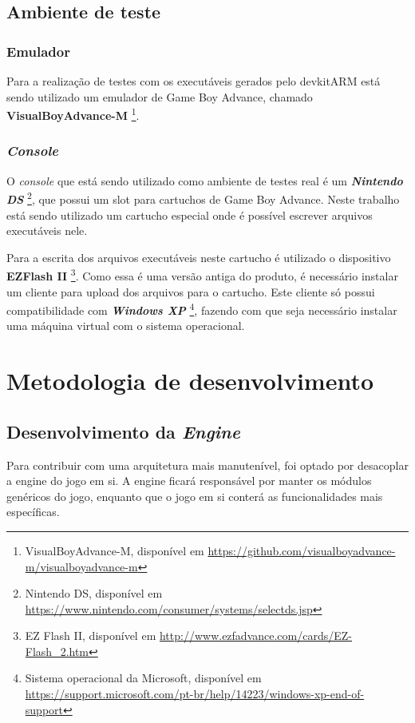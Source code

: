   \subsection{Ambiente de teste}

    \subsubsection{Emulador}

      Para a realização de testes com os executáveis gerados pelo devkitARM está sendo utilizado um emulador de Game Boy Advance, chamado \textbf{VisualBoyAdvance-M} \footnote{VisualBoyAdvance-M, disponível em \url{https://github.com/visualboyadvance-m/visualboyadvance-m}}.

    \subsubsection{\textit{Console}}

      O \textit {console} que está sendo utilizado como ambiente de testes real é um \textbf{\textit{Nintendo DS}} \footnote{Nintendo DS, disponível em \url{https://www.nintendo.com/consumer/systems/selectds.jsp}}, que possui um slot para cartuchos de Game Boy Advance. Neste trabalho está sendo utilizado um cartucho especial onde é possível escrever arquivos executáveis nele.

      Para a escrita dos arquivos executáveis neste cartucho é utilizado o dispositivo \textbf{EZFlash II} \footnote{EZ Flash II, disponível em \url{http://www.ezfadvance.com/cards/EZ-Flash_2.htm}}. Como essa é uma versão antiga do produto, é necessário instalar um cliente para upload dos arquivos para o cartucho. Este cliente só possui compatibilidade com \textit{\textbf{Windows XP}} \footnote{Sistema operacional da Microsoft, disponível em \url{https://support.microsoft.com/pt-br/help/14223/windows-xp-end-of-support}}, fazendo com que seja necessário instalar uma máquina virtual com o sistema operacional.

\section{Metodologia de desenvolvimento}

  \subsection{Desenvolvimento da \textit{Engine}}

    Para contribuir com uma arquitetura mais manutenível, foi optado por desacoplar a engine do jogo em si. A engine ficará responsável por manter os módulos genéricos do jogo, enquanto que o jogo em si conterá as funcionalidades mais específicas.

